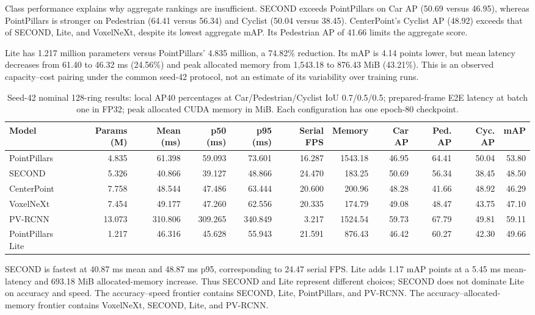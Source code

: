 \documentclass[10pt,twocolumn]{article}
\begin{document}
Class performance explains why aggregate rankings are insufficient. SECOND exceeds PointPillars on Car AP (50.69 versus 46.95), whereas PointPillars is stronger on Pedestrian (64.41 versus 56.34) and Cyclist (50.04 versus 38.45). CenterPoint's Cyclist AP (48.92) exceeds that of SECOND, Lite, and VoxelNeXt, despite its lowest aggregate mAP. Its Pedestrian AP of 41.66 limits the aggregate score.

Lite has 1.217 million parameters versus PointPillars' 4.835 million, a 74.82\% reduction. Its mAP is 4.14 points lower, but mean latency decreases from 61.40 to 46.32 ms (24.56\%) and peak allocated memory from 1,543.18 to 876.43 MiB (43.21\%). This is an observed capacity--cost pairing under the common seed-42 protocol, not an estimate of its variability over training runs.
\begin{table}[!tbp]
\centering\scriptsize
\caption{Seed-42 nominal 128-ring results: local AP40 percentages at Car/Pedestrian/Cyclist IoU 0.7/0.5/0.5; prepared-frame E2E latency at batch one in FP32; peak allocated CUDA memory in MiB. Each configuration has one epoch-80 checkpoint.}
\label{tab:main}
\begin{adjustbox}{max width=\textwidth}\begin{tabular}{lrrrrrrrrrr}
\toprule
Model & Params (M) & Mean (ms) & p50 (ms) & p95 (ms) & Serial FPS & Memory & Car AP & Ped. AP & Cyc. AP & mAP\\
\midrule
PointPillars & 4.835 & 61.398 & 59.093 & 73.601 & 16.287 & 1543.18 & 46.95 & 64.41 & 50.04 & 53.80\\
SECOND & 5.326 & 40.866 & 39.127 & 48.866 & 24.470 & 183.25 & 50.69 & 56.34 & 38.45 & 48.50\\
CenterPoint & 7.758 & 48.544 & 47.486 & 63.444 & 20.600 & 200.96 & 48.28 & 41.66 & 48.92 & 46.29\\
VoxelNeXt & 7.454 & 49.177 & 47.260 & 62.556 & 20.335 & 174.79 & 49.08 & 48.47 & 43.75 & 47.10\\
PV-RCNN & 13.073 & 310.806 & 309.265 & 340.849 & 3.217 & 1524.54 & 59.73 & 67.79 & 49.81 & 59.11\\
PointPillars Lite & 1.217 & 46.316 & 45.628 & 55.943 & 21.591 & 876.43 & 46.42 & 60.27 & 42.30 & 49.66\\
\bottomrule
\end{tabular}\end{adjustbox}
\end{table}


SECOND is fastest at 40.87 ms mean and 48.87 ms p95, corresponding to 24.47 serial FPS. Lite adds 1.17 mAP points at a 5.45 ms mean-latency and 693.18 MiB allocated-memory increase. Thus SECOND and Lite represent different choices; SECOND does not dominate Lite on accuracy and speed. The accuracy--speed frontier contains SECOND, Lite, PointPillars, and PV-RCNN. The accuracy--allocated-memory frontier contains VoxelNeXt, SECOND, Lite, and PV-RCNN.
\end{document}

